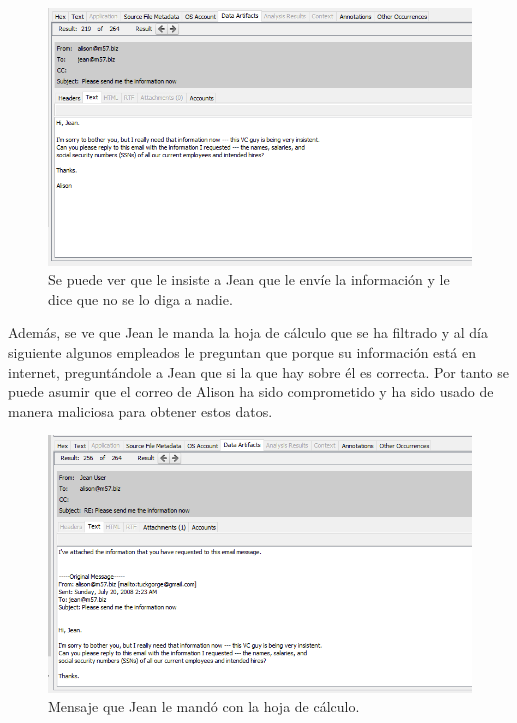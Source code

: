 \documentclass{article}
\begin{document}
\begin{figure}[H]
    \centering
    \includegraphics[width=\textwidth]{imagenes/Windows/Captura de pantalla (10).png}
    \caption{Se puede ver que le insiste a Jean que le envíe la información y le dice que no se lo diga a nadie.}
\end{figure}

Además, se ve que Jean le manda la hoja de cálculo que se ha filtrado y al día siguiente algunos empleados le preguntan que porque su información está en internet, preguntándole a Jean que si la que hay sobre él es correcta. Por tanto se puede asumir que el correo de Alison ha sido comprometido y ha sido usado de manera maliciosa para obtener estos datos.

\begin{figure}[H]
    \centering
    \includegraphics[width=\textwidth]{imagenes/Windows/Captura de pantalla (13).png}
    \caption{Mensaje que Jean le mandó con la hoja de cálculo.}
\end{figure}
\end{document}
